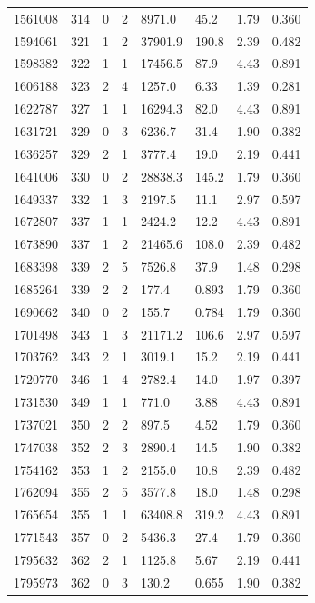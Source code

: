 \documentclass[preview]{standalone}
\begin{document}
{{{{{\begin{tabular}{L{1.2cm}C{1.2cm} C{0.3cm}C{0.5cm} C{1.4cm}C{1.4cm} C{1.4cm}C{1.4cm}}
  1561008  &   314  & 0     &  2 &  8971.0  & 45.2  & 1.79 &  0.360   \\ 
  1594061  &   321  & 1     &  2 &  37901.9  & 190.8  & 2.39 &  0.482   \\ 
  1598382  &   322  & 1     &  1 &  17456.5  & 87.9  & 4.43 &  0.891   \\ 
  1606188  &   323  & 2     &  4 &  1257.0  & 6.33  & 1.39 &  0.281   \\ 
  1622787  &   327  & 1     &  1 &  16294.3  & 82.0  & 4.43 &  0.891   \\ 
  1631721  &   329  & 0     &  3 &  6236.7  & 31.4  & 1.90 &  0.382   \\ 
  1636257  &   329  & 2     &  1 &  3777.4  & 19.0  & 2.19 &  0.441   \\ 
  1641006  &   330  & 0     &  2 &  28838.3  & 145.2  & 1.79 &  0.360   \\ 
  1649337  &   332  & 1     &  3 &  2197.5  & 11.1  & 2.97 &  0.597   \\ 
  1672807  &   337  & 1     &  1 &  2424.2  & 12.2  & 4.43 &  0.891   \\ 
  1673890  &   337  & 1     &  2 &  21465.6  & 108.0  & 2.39 &  0.482   \\ 
  1683398  &   339  & 2     &  5 &  7526.8  & 37.9  & 1.48 &  0.298   \\ 
  1685264  &   339  & 2     &  2 &  177.4  & 0.893  & 1.79 &  0.360   \\ 
  1690662  &   340  & 0     &  2 &  155.7  & 0.784  & 1.79 &  0.360   \\ 
  1701498  &   343  & 1     &  3 &  21171.2  & 106.6  & 2.97 &  0.597   \\ 
  1703762  &   343  & 2     &  1 &  3019.1  & 15.2  & 2.19 &  0.441   \\ 
  1720770  &   346  & 1     &  4 &  2782.4  & 14.0  & 1.97 &  0.397   \\ 
  1731530  &   349  & 1     &  1 &  771.0  & 3.88  & 4.43 &  0.891   \\ 
  1737021  &   350  & 2     &  2 &  897.5  & 4.52  & 1.79 &  0.360   \\ 
  1747038  &   352  & 2     &  3 &  2890.4  & 14.5  & 1.90 &  0.382   \\ 
  1754162  &   353  & 1     &  2 &  2155.0  & 10.8  & 2.39 &  0.482   \\ 
  1762094  &   355  & 2     &  5 &  3577.8  & 18.0  & 1.48 &  0.298   \\ 
  1765654  &   355  & 1     &  1 &  63408.8  & 319.2  & 4.43 &  0.891   \\ 
  1771543  &   357  & 0     &  2 &  5436.3  & 27.4  & 1.79 &  0.360   \\ 
  1795632  &   362  & 2     &  1 &  1125.8  & 5.67  & 2.19 &  0.441   \\ 
  1795973  &   362  & 0     &  3 &  130.2  & 0.655  & 1.90 &  0.382   \\ 
\hline 
\end{tabular} 

}}}}}
\end{document}
